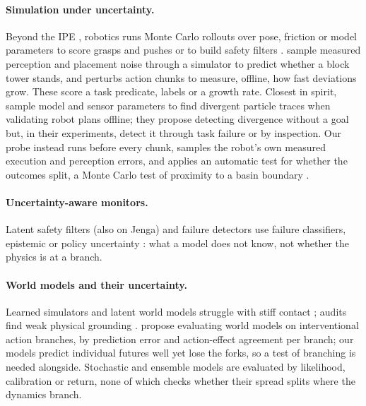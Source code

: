 \documentclass{article}
\begin{document}
\paragraph{Simulation under uncertainty.} Beyond the IPE \citep{zhou2023mental}, robotics runs Monte Carlo rollouts over pose, friction or model parameters to
score grasps and pushes \citep{mahler2017dexnet,agboh2018pushing} or to build safety filters
\citep{johansson2025safety,wang2026manidreams}. \citet{cannizzaro2024cobra} sample measured perception
and placement noise through a simulator to predict whether a block tower stands, and
\citet{goyal2026stability} perturbs action chunks to measure, offline, how fast deviations grow. These
score a task predicate, labels \citep{lerer2016learning} or a growth rate. Closest in spirit,
\citet{zapolsky2016particle} sample model and sensor parameters to find divergent particle traces when
validating robot plans offline; they propose detecting divergence without a goal but, in their
experiments, detect it through task failure or by inspection. Our probe instead runs before every chunk,
samples the robot's own measured execution and perception errors, and applies an automatic test for
whether the outcomes split, a Monte Carlo test of proximity to a basin boundary \citep{menck2013basin}.
\paragraph{Uncertainty-aware monitors.} Latent safety filters (also on Jenga) and failure detectors use
failure classifiers, epistemic or policy uncertainty \citep{nakamura2025generalizing,seo2025uncertainty,xu2025failure,agia2024unpacking}:
what a model does not know, not whether the physics is at a branch.
\paragraph{World models and their uncertainty.} Learned simulators and latent world models
\citep{sanchezgonzalez2020learning,allen2023fignet,zhou2025dinowm,assran2025vjepa2,hafner2025dreamerv3}
struggle with stiff contact \citep{parmar2021fundamental}; audits find weak physical grounding
\citep{bear2021physion,motamed2026physicsiq,yang2026mirabench}.
\citet{yu2026evaluated} propose evaluating world models on interventional action branches, by
prediction error and action-effect agreement per branch; our models predict individual futures well yet
lose the forks, so a test of branching is needed alongside. Stochastic and ensemble models
\citep{chua2018pets,lakshminarayanan2017ensembles} are evaluated by likelihood, calibration or return,
none of which checks whether their spread splits where the dynamics branch.
\end{document}
